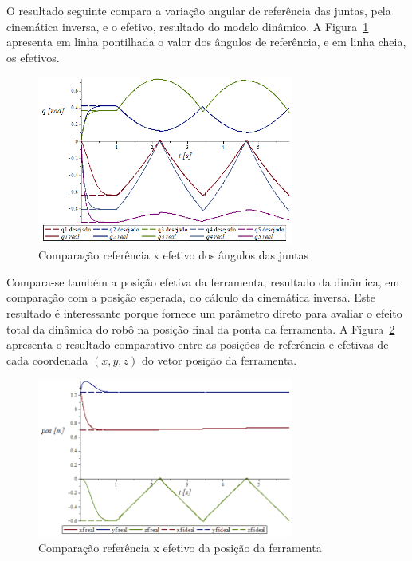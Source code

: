O resultado seguinte compara a variação angular de referência das juntas, pela
cinemática inversa, e o efetivo, resultado do modelo dinâmico.
A Figura~\ref{fig::qxt_ex_realxideal} apresenta em linha pontilhada o valor dos
ângulos de referência, e em linha cheia, os efetivos.

\begin{figure}[h]
	\centering 
 	\includegraphics[width=0.75\textwidth]{figs/qxt_ex_realxideal}
 	\caption{Comparação referência x efetivo dos ângulos das juntas}
 	\label{fig::qxt_ex_realxideal}
\end{figure}

Compara-se também a posição efetiva da ferramenta, resultado da dinâmica, em
comparação com a posição esperada, do cálculo da cinemática inversa. Este
resultado é interessante porque fornece um parâmetro direto para avaliar o
efeito total da dinâmica do robô na posição final da ponta da ferramenta.
A Figura~\ref{fig::errop_exemplo} apresenta o resultado comparativo entre as
posições de referência e efetivas de cada coordenada $(x, y, z)$ do vetor
posição da ferramenta.

\begin{figure}[h]
	\centering 
 	\includegraphics[width=0.75\textwidth]{figs/errop_exemplo}
 	\caption{Comparação referência x efetivo da posição da ferramenta}
 	\label{fig::errop_exemplo}
\end{figure}

